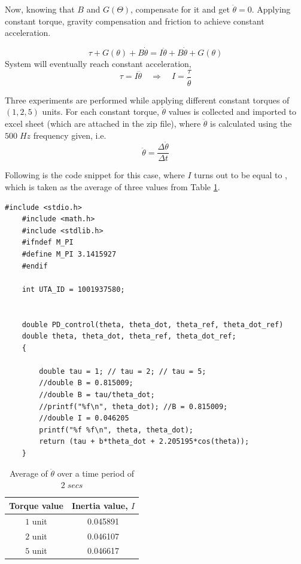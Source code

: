 \documentclass[12pt]{article}
\newcommand\Tstrut{\rule{0pt}{2.6ex}}         %
\newcommand\Bstrut{\rule[-0.9ex]{0pt}{0pt}}   %
\begin{document}
Now, knowing that $B$ and $G(\Theta)$, compensate for it and get $\ddot{\theta} = 0$. Applying constant torque, gravity compensation and friction to achieve constant acceleration. 

\begin{equation}
	\tau +G(\theta) + B \dot{\theta}=I \ddot{\theta}+B \dot{\theta}+G(\theta)
\end{equation}
System will eventually reach constant acceleration, 
\begin{equation}
	\tau=I \dddot{\theta} \quad \Rightarrow \quad I=\frac{\tau}{\ddot{\theta}}
\end{equation}

Three experiments are performed while applying different constant torques of $(1, 2, 5)$ units. For each constant torque, $\dot{\theta}$ values is collected and imported to excel sheet (which are attached in the zip file), where $\ddot{\theta}$ is calculated using the $500 \; Hz$ frequency given, i.e. 
\begin{equation}
	\ddot{\theta} = \frac{\Delta \dot{\theta}}{\Delta t}
\end{equation}

 Following is the code snippet for this case, where $I$ turns out to be equal to , which is taken as the average of three values from Table \ref{table:1}.
 

	
\begin{lstlisting}[style=CStyle]
	#include <stdio.h>
	#include <math.h>
	#include <stdlib.h>
	#ifndef M_PI
	#define M_PI 3.1415927
	#endif
	
	int UTA_ID = 1001937580;
	
	
	double PD_control(theta, theta_dot, theta_ref, theta_dot_ref)
	double theta, theta_dot, theta_ref, theta_dot_ref;
	{
		
		double tau = 1; // tau = 2; // tau = 5;
		//double B = 0.815009;
		//double B = tau/theta_dot;
		//printf("%f\n", theta_dot); //B = 0.815009;
		//double I = 0.046205
		printf("%f %f\n", theta, theta_dot);
		return (tau + b*theta_dot + 2.205195*cos(theta));
	}
\end{lstlisting}	

	\begin{table}[h!]
		\centering
		\begin{tabular}{|c|c|} 
			\hline
			\textbf{Torque value} & \textbf{Inertia value, $I$} \Tstrut \Bstrut\\ [0.5ex] 
			\hline\hline
			$1$ unit & 0.045891\Tstrut\Tstrut \\ \hline
			$2$ unit & 0.046107\Tstrut\Tstrut\Bstrut \\ \hline
			$5$ unit & 0.046617\Tstrut\Tstrut \\[0.5ex] 
			\hline
		\end{tabular}
		\caption{Average of $\ddot{\theta}$ over a time period of $2 \; secs$}
		\label{table:1}
	\end{table}
\newpage
\end{document}

